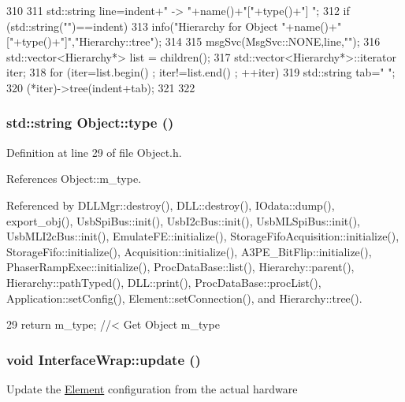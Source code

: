 \begin{DoxyCode}
310                                     {
311   std::string line=indent+" -> "+name()+"["+type()+"] ";
312   if (std::string("")==indent){
313     info("Hierarchy for Object "+name()+"["+type()+"]","Hierarchy::tree");
314   }
315   msgSvc(MsgSvc::NONE,line,"");
316   std::vector<Hierarchy*> list = children();
317   std::vector<Hierarchy*>::iterator iter;
318   for (iter=list.begin() ; iter!=list.end() ; ++iter){
319     std::string tab="  ";
320     (*iter)->tree(indent+tab);
321   }
322 }
\end{DoxyCode}
\hypertarget{classObject_a84f99f70f144a83e1582d1d0f84e4e62}{
\subsubsection[{type}]{\setlength{\rightskip}{0pt plus 5cm}std::string Object::type ()}}
\label{classObject_a84f99f70f144a83e1582d1d0f84e4e62}


Definition at line 29 of file Object.h.

References Object::m\_\-type.

Referenced by DLLMgr::destroy(), DLL::destroy(), IOdata::dump(), export\_\-obj(), UsbSpiBus::init(), UsbI2cBus::init(), UsbMLSpiBus::init(), UsbMLI2cBus::init(), EmulateFE::initialize(), StorageFifoAcquisition::initialize(), StorageFifo::initialize(), Acquisition::initialize(), A3PE\_\-BitFlip::initialize(), PhaserRampExec::initialize(), ProcDataBase::list(), Hierarchy::parent(), Hierarchy::pathTyped(), DLL::print(), ProcDataBase::procList(), Application::setConfig(), Element::setConnection(), and Hierarchy::tree().


\begin{DoxyCode}
29 { return m_type;       } //< Get Object m_type
\end{DoxyCode}
\hypertarget{structInterfaceWrap_aee2f0407da52a1de8659b1d83af62238}{
\subsubsection[{update}]{\setlength{\rightskip}{0pt plus 5cm}void InterfaceWrap::update ()}}
\label{structInterfaceWrap_aee2f0407da52a1de8659b1d83af62238}
Update the \hyperlink{classElement}{Element} configuration from the actual hardware 

